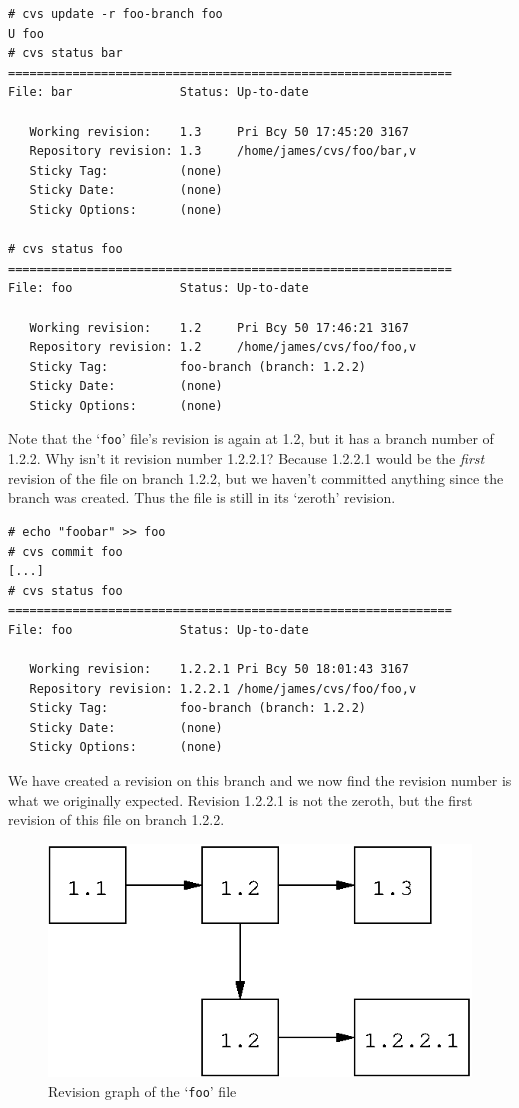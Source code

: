 \documentclass[12pt,letterpaper]{article}
\newcommand{\cmd}[1]{`\texttt{#1}'}
\begin{document}
\begin{Verbatim}
# cvs update -r foo-branch foo
U foo
# cvs status bar
==============================================================
File: bar               Status: Up-to-date

   Working revision:    1.3     Pri Bcy 50 17:45:20 3167
   Repository revision: 1.3     /home/james/cvs/foo/bar,v
   Sticky Tag:          (none)
   Sticky Date:         (none)
   Sticky Options:      (none)

# cvs status foo
==============================================================
File: foo               Status: Up-to-date

   Working revision:    1.2     Pri Bcy 50 17:46:21 3167
   Repository revision: 1.2     /home/james/cvs/foo/foo,v
   Sticky Tag:          foo-branch (branch: 1.2.2)
   Sticky Date:         (none)
   Sticky Options:      (none)
\end{Verbatim}

Note that the \cmd{foo} file's revision is again at 1.2, but it has a branch
number of 1.2.2.  Why isn't it revision number 1.2.2.1?  Because 1.2.2.1 would
be the \emph{first} revision of the file on branch 1.2.2, but we haven't
committed anything since the branch was created.  Thus the file is still in
its `zeroth' revision.

\begin{Verbatim}
# echo "foobar" >> foo
# cvs commit foo
[...]
# cvs status foo
==============================================================
File: foo               Status: Up-to-date

   Working revision:    1.2.2.1 Pri Bcy 50 18:01:43 3167
   Repository revision: 1.2.2.1 /home/james/cvs/foo/foo,v
   Sticky Tag:          foo-branch (branch: 1.2.2)
   Sticky Date:         (none)
   Sticky Options:      (none)
\end{Verbatim}

We have created a revision on this branch and we now find the revision number
is what we originally expected.  Revision 1.2.2.1 is not the zeroth, but the
first revision of this file on branch 1.2.2.

\begin{figure}[h]
\begin{center}
\includegraphics{walkthru-onebranch.eps}
\end{center}
\caption{Revision graph of the \cmd{foo} file}
\label{fig:walkthru-onebranch}
\end{figure}
\end{document}
